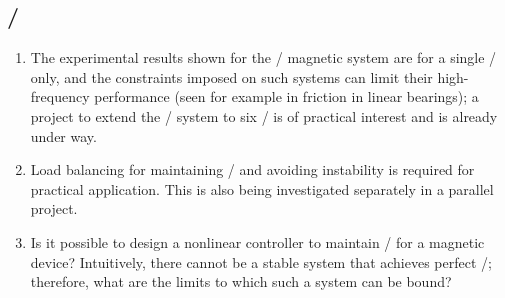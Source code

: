 \documentclass[10pt,a4paper]{memoir}
\begin{document}
\subsection{\QZS/}

\begin{enumerate}
\item
The experimental results shown for the \qzs/ magnetic system are for a single \dof/ only, and the constraints imposed on such systems can limit their high-frequency performance (seen for example in friction in linear bearings); a project to extend the \qzs/ system to six \dofs/ is of practical interest and is already under way.

\item
Load balancing for maintaining \qzs/ and avoiding instability is required for practical application.
This is also being investigated separately in a parallel project.

\item
Is it possible to design a nonlinear controller to maintain \qzs/ for a magnetic device?
Intuitively, there cannot be a stable system that achieves perfect \qzs/; therefore, what are the limits to which such a system can be bound?
\end{enumerate}
\end{document}

